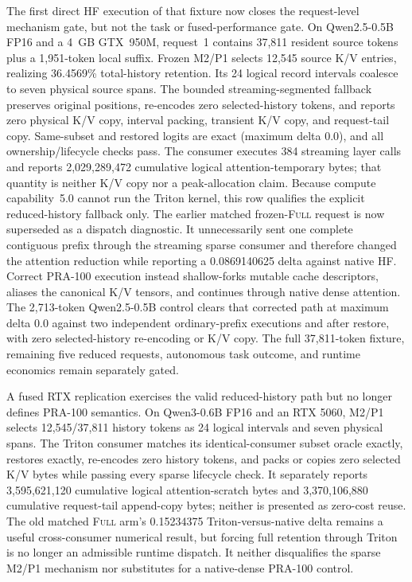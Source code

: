 \documentclass[11pt]{article}
\begin{document}
The first direct HF execution of that fixture now closes the request-level
mechanism gate, but not the task or fused-performance gate.  On
Qwen2.5-0.5B FP16 and a 4~GB GTX~950M, request~1 contains 37,811 resident
source tokens plus a 1,951-token local suffix.  Frozen M2/P1 selects 12,545
source K/V entries, realizing 36.4569\% total-history retention.  Its 24
logical record intervals coalesce to seven physical source spans.  The bounded
streaming-segmented fallback preserves original positions, re-encodes zero
selected-history tokens, and reports zero physical K/V copy, interval packing,
transient K/V copy, and request-tail copy.  Same-subset and restored logits are
exact (maximum delta 0.0), and all ownership/lifecycle checks pass.  The
consumer executes 384 streaming layer calls and reports 2,029,289,472
cumulative logical attention-temporary bytes; that quantity is neither K/V
copy nor a peak-allocation claim.  Because compute capability~5.0 cannot run
the Triton kernel, this row qualifies the explicit reduced-history fallback
only.  The earlier matched frozen-\textsc{Full} request is now superseded as a
dispatch diagnostic.  It unnecessarily sent one complete contiguous prefix
through the streaming sparse consumer and therefore changed the attention
reduction while reporting a 0.0869140625 delta against native HF.  Correct
PRA-100 execution instead shallow-forks mutable cache descriptors, aliases the
canonical K/V tensors, and continues through native dense attention.  The
2,713-token Qwen2.5-0.5B control clears that corrected path at maximum delta
0.0 against two independent ordinary-prefix executions and after restore,
with zero selected-history re-encoding or K/V copy.  The full 37,811-token
fixture, remaining five reduced requests, autonomous task outcome, and runtime
economics remain separately gated.

A fused RTX replication exercises the valid reduced-history path but no longer
defines PRA-100 semantics.  On Qwen3-0.6B FP16 and an RTX 5060, M2/P1 selects
12,545/37,811 history tokens as 24 logical intervals and seven physical spans.
The Triton consumer matches its identical-consumer subset oracle exactly,
restores exactly, re-encodes zero history tokens, and packs or copies zero
selected K/V bytes while passing every sparse lifecycle check.  It separately
reports 3,595,621,120 cumulative logical attention-scratch bytes and
3,370,106,880 cumulative request-tail append-copy bytes; neither is presented
as zero-cost reuse.  The old matched \textsc{Full} arm's 0.15234375
Triton-versus-native delta remains a useful cross-consumer numerical result,
but forcing full retention through Triton is no longer an admissible runtime
dispatch.  It neither disqualifies the sparse M2/P1 mechanism nor substitutes
for a native-dense PRA-100 control.
\end{document}
